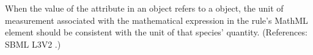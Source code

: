 When the value of the attribute  in an \AssignmentRule
object refers to a \Species object, the unit of measurement associated with
the mathematical expression in the rule's MathML  element
should be consistent with the unit of that species' quantity.  (References:
SBML L3V2 .)
